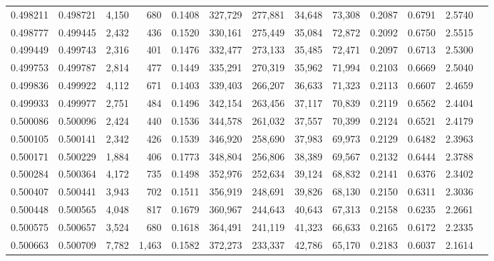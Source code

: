 \begin{tabular}{rrrrrrrrrrrrr}
0.498211 & 0.498721 & 4,150 &   680 &                                     0.1408 & 327,729 & 277,881 &  34,648 &  73,308 & 0.2087 & 0.6791 & 2.5740 \\
0.498777 & 0.499445 & 2,432 &   436 &                                     0.1520 & 330,161 & 275,449 &  35,084 &  72,872 & 0.2092 & 0.6750 & 2.5515 \\
0.499449 & 0.499743 & 2,316 &   401 &                                     0.1476 & 332,477 & 273,133 &  35,485 &  72,471 & 0.2097 & 0.6713 & 2.5300 \\
0.499753 & 0.499787 & 2,814 &   477 &                                     0.1449 & 335,291 & 270,319 &  35,962 &  71,994 & 0.2103 & 0.6669 & 2.5040 \\
0.499836 & 0.499922 & 4,112 &   671 &                                     0.1403 & 339,403 & 266,207 &  36,633 &  71,323 & 0.2113 & 0.6607 & 2.4659 \\
0.499933 & 0.499977 & 2,751 &   484 &                                     0.1496 & 342,154 & 263,456 &  37,117 &  70,839 & 0.2119 & 0.6562 & 2.4404 \\
0.500086 & 0.500096 & 2,424 &   440 &                                     0.1536 & 344,578 & 261,032 &  37,557 &  70,399 & 0.2124 & 0.6521 & 2.4179 \\
0.500105 & 0.500141 & 2,342 &   426 &                                     0.1539 & 346,920 & 258,690 &  37,983 &  69,973 & 0.2129 & 0.6482 & 2.3963 \\
0.500171 & 0.500229 & 1,884 &   406 &                                     0.1773 & 348,804 & 256,806 &  38,389 &  69,567 & 0.2132 & 0.6444 & 2.3788 \\
0.500284 & 0.500364 & 4,172 &   735 &                                     0.1498 & 352,976 & 252,634 &  39,124 &  68,832 & 0.2141 & 0.6376 & 2.3402 \\
0.500407 & 0.500441 & 3,943 &   702 &                                     0.1511 & 356,919 & 248,691 &  39,826 &  68,130 & 0.2150 & 0.6311 & 2.3036 \\
0.500448 & 0.500565 & 4,048 &   817 &                                     0.1679 & 360,967 & 244,643 &  40,643 &  67,313 & 0.2158 & 0.6235 & 2.2661 \\
0.500575 & 0.500657 & 3,524 &   680 &                                     0.1618 & 364,491 & 241,119 &  41,323 &  66,633 & 0.2165 & 0.6172 & 2.2335 \\
0.500663 & 0.500709 & 7,782 & 1,463 &                                     0.1582 & 372,273 & 233,337 &  42,786 &  65,170 & 0.2183 & 0.6037 & 2.1614 \\

\end{tabular}
